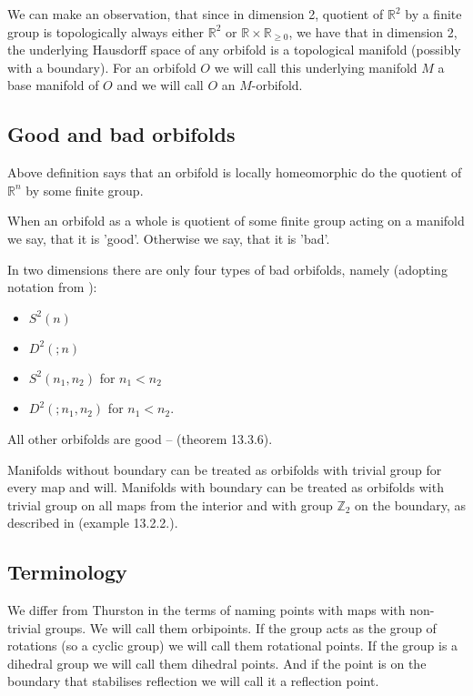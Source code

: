 We can make an observation, that since in dimension 2, quotient of $\mathbb{R}^2$ by a finite 
group is topologically always either $\mathbb{R}^2$ or $\mathbb{R}\times\mathbb{R}_{\geq 0}$, 
we have that in dimension 2, the underlying Hausdorff space of any orbifold is a topological 
manifold (possibly with a boundary). For an orbifold $O$ we will call this underlying manifold $M$
a base manifold of $O$ and we will call $O$ an $M$-orbifold.  

\subsection{Good and bad orbifolds}
Above definition says that an orbifold is locally homeomorphic do the quotient of $\mathbb{R}^n$ 
by some finite group. 

When an orbifold as a whole is quotient of some finite group acting on a manifold we say, that 
it is 'good'. Otherwise we say, that it is 'bad'. 


In two dimensions there are only four types of bad orbifolds, namely
(adopting notation from \cite{Thurston1979}): 
\begin{itemize}
\item $S^2(n)$ 
\item $D^2(;n)$ 
\item $S^2(n_1,n_2)$ for $n_1 < n_2$ 
\item $D^2(;n_1,n_2)$ for $n_1 < n_2$. 
\end{itemize}
All other orbifolds are good -- \cite{Thurston1979} (theorem 13.3.6).


Manifolds without boundary can be treated as orbifolds with trivial group for every map and will. 
Manifolds with boundary can be treated as orbifolds with trivial group on all maps from the 
interior and with group $\mathbb{Z}_2$ on the boundary, as described in \cite{Thurston1979} 
(example 13.2.2.).

\subsection{Terminology}
We differ from Thurston in the terms of naming points with maps with non-trivial groups. 
We will call them orbipoints. If the group acts as the group of rotations (so a 
cyclic group) we will call them rotational points. If the group is a dihedral group we will 
call them 
dihedral points. And if the point is on the boundary that stabilises reflection we will call it a 
reflection point. 

